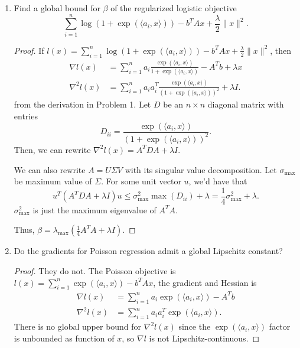 \documentclass[11pt]{amsart}
\begin{document}
\begin{enumerate}
\begin{enumerate}
\begin{proof}
    Thus, we have that
    $\beta = \lambda_1 = \lambda_{\operatorname{max}} \left(A^TA\right)$, that
    is, the maximum eigenvalue of $A^TA$.
  \end{proof}
\item Find a global bound for $\beta$ of the regularized logistic objective 
\[
\sum_{i=1}^n \log(1+\exp(\langle a_i, x\rangle)) - b^TAx + \frac{\lambda}{2}\|x\|^2. 
\]
\begin{proof}
  If
  $l(x) = \sum_{i=1}^n \log(1+\exp(\langle a_i, x\rangle)) - b^TAx +
  \frac{\lambda}{2}\|x\|^2$, then
  \begin{align*}
    \nabla l(x)
    &= \sum_{i=1}^n a_i\frac{\exp(\langle a_i, x\rangle)}{1+\exp(\langle a_i, x\rangle)} - A^Tb + \lambda x \\
    \nabla^2 l(x)
    &= \sum_{i=1}^n a_ia_i^T\frac{\exp(\langle a_i, x\rangle)}{\left(1+\exp(\langle a_i, x\rangle)\right)^2} + \lambda I.
  \end{align*}
  from the derivation in Problem 1. Let $D$ be an $n \times n$ diagonal matrix
  with entries
  $$D_{ii} = \frac{\exp(\langle a_i, x\rangle)}{\left(1+\exp(\langle a_i,
      x\rangle)\right)^2}.$$ Then, we can rewrite
  $\nabla^2 l(x) = A^TDA + \lambda I$.

  We can also rewrite $A = U \Sigma V$ with its singular value
  decomposition. Let $\sigma_{\operatorname{max}}$ be maximum value of $\Sigma$. For some unit
  vector $u$, we'd have that
  \begin{equation*}
    u^T\left(A^TDA + \lambda I\right)u \leq \sigma_{\operatorname{max}}^2 \max\left(D_{ii}\right) + \lambda = \frac{1}{4}\sigma_{\operatorname{max}}^2  + \lambda.
  \end{equation*}
  $\sigma_{\operatorname{max}}^2$ is just the maximum eigenvalue of $A^TA$.
  
  Thus,
  $\beta = \lambda_{\operatorname{max}}\left(\frac{1}{4}A^TA + \lambda
    I\right).$
\end{proof}
\item Do the gradients for Poisson regression admit a global Lipschitz constant?

  \begin{proof}
    They do not. The Poisson objective is
    $l(x) = \sum_{i=1}^n \exp(\langle a_i, x \rangle) - b^TAx$, the gradient and
    Hessian is
    \begin{align*}
      \nabla l(x) &= \sum_{i=1}^n a_i \exp(\langle a_i, x \rangle) - A^Tb \\
      \nabla^2 l(x) &= \sum_{i=1}^n a_ia_i^T \exp(\langle a_i, x \rangle).
    \end{align*}
    There is no global upper bound for $\nabla^2 l(x)$ since the
    $\exp(\langle a_i, x \rangle)$ factor is unbounded as function of $x$, so
    $\nabla l$ is not Lipschitz-continuous.
  \end{proof}
\end{enumerate}




\end{enumerate}
\end{document}

